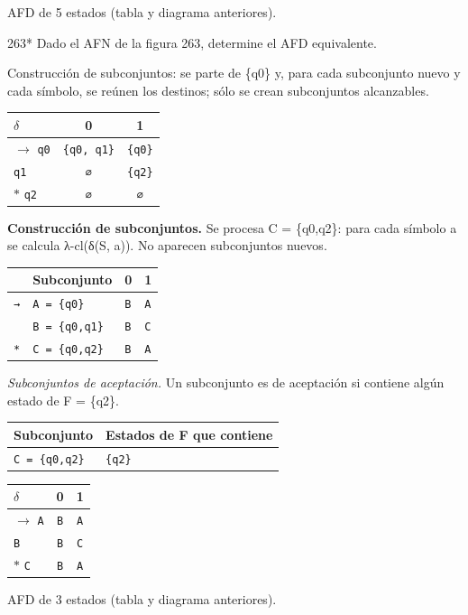 \documentclass[11pt]{article}
\begin{document}
\resp AFD de 5 estados (tabla y diagrama anteriores).


\begin{ejercicio}{263}{*}
Dado el AFN de la figura 263, determine el AFD equivalente.
\end{ejercicio}
\proc Construcción de subconjuntos: se parte de \{q0\} y, para cada subconjunto nuevo y cada símbolo, se reúnen los destinos; sólo se crean subconjuntos alcanzables.
\begin{center}\small\begin{tabular}{lcc}\toprule
$\delta$ & 0 & 1 \\\midrule
$\to$ \texttt{q0} & \texttt{\{q0, q1\}} & \texttt{\{q0\}} \\
 \texttt{q1} & \texttt{∅} & \texttt{\{q2\}} \\
$*$ \texttt{q2} & \texttt{∅} & \texttt{∅} \\
\bottomrule\end{tabular}\end{center}
\textbf{Construcción de subconjuntos.} Se procesa C = \{q0,q2\}: para cada símbolo a se calcula λ-cl(δ(S, a)). No aparecen subconjuntos nuevos.
\begin{center}\footnotesize\begin{tabular}{llll}\toprule
 & Subconjunto & 0 & 1 \\\midrule
\texttt{→} & \texttt{A = \{q0\}} & \texttt{B} & \texttt{A} \\
\texttt{} & \texttt{B = \{q0,q1\}} & \texttt{B} & \texttt{C} \\
\texttt{*} & \texttt{C = \{q0,q2\}} & \texttt{B} & \texttt{A} \\
\bottomrule\end{tabular}\end{center}
\textit{Subconjuntos de aceptación.} Un subconjunto es de aceptación si contiene algún estado de F = \{q2\}.
\begin{center}\footnotesize\begin{tabular}{ll}\toprule
Subconjunto & Estados de F que contiene \\\midrule
\texttt{C = \{q0,q2\}} & \texttt{\{q2\}} \\
\bottomrule\end{tabular}\end{center}
\begin{center}\small\begin{tabular}{lcc}\toprule
$\delta$ & 0 & 1 \\\midrule
$\to$ \texttt{A} & \texttt{B} & \texttt{A} \\
 \texttt{B} & \texttt{B} & \texttt{C} \\
$*$ \texttt{C} & \texttt{B} & \texttt{A} \\
\bottomrule\end{tabular}\end{center}

\resp AFD de 3 estados (tabla y diagrama anteriores).
\end{document}
